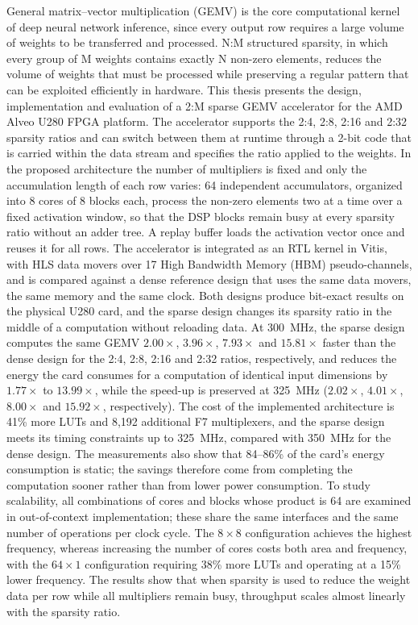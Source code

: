 \documentclass[greek, histinit, english, twosided]{book}
\begin{document}
General matrix--vector multiplication (GEMV) is the core computational kernel of deep neural network inference, since every output row requires a large volume of weights to be transferred and processed. N:M structured sparsity, in which every group of M weights contains exactly N non-zero elements, reduces the volume of weights that must be processed while preserving a regular pattern that can be exploited efficiently in hardware. This thesis presents the design, implementation and evaluation of a 2:M sparse GEMV accelerator for the AMD Alveo U280 FPGA platform. The accelerator supports the 2:4, 2:8, 2:16 and 2:32 sparsity ratios and can switch between them at runtime through a 2-bit code that is carried within the data stream and specifies the ratio applied to the weights. In the proposed architecture the number of multipliers is fixed and only the accumulation length of each row varies: 64 independent accumulators, organized into 8 cores of 8 blocks each, process the non-zero elements two at a time over a fixed activation window, so that the DSP blocks remain busy at every sparsity ratio without an adder tree. A replay buffer loads the activation vector once and reuses it for all rows. The accelerator is integrated as an RTL kernel in Vitis, with HLS data movers over 17 High Bandwidth Memory (HBM) pseudo-channels, and is compared against a dense reference design that uses the same data movers, the same memory and the same clock. Both designs produce bit-exact results on the physical U280 card, and the sparse design changes its sparsity ratio in the middle of a computation without reloading data. At 300~MHz, the sparse design computes the same GEMV $2.00\times$, $3.96\times$, $7.93\times$ and $15.81\times$ faster than the dense design for the 2:4, 2:8, 2:16 and 2:32 ratios, respectively, and reduces the energy the card consumes for a computation of identical input dimensions by $1.77\times$ to $13.99\times$, while the speed-up is preserved at 325~MHz ($2.02\times$, $4.01\times$, $8.00\times$ and $15.92\times$, respectively). The cost of the implemented architecture is 41\% more LUTs and 8,192 additional F7 multiplexers, and the sparse design meets its timing constraints up to 325~MHz, compared with 350~MHz for the dense design. The measurements also show that 84--86\% of the card's energy consumption is static; the savings therefore come from completing the computation sooner rather than from lower power consumption. To study scalability, all combinations of cores and blocks whose product is 64 are examined in out-of-context implementation; these share the same interfaces and the same number of operations per clock cycle. The $8\times8$ configuration achieves the highest frequency, whereas increasing the number of cores costs both area and frequency, with the $64\times1$ configuration requiring 38\% more LUTs and operating at a 15\% lower frequency.
The results show that when sparsity is used to reduce the weight data per row while all multipliers remain busy, throughput scales almost linearly with the sparsity ratio.
\end{document}
